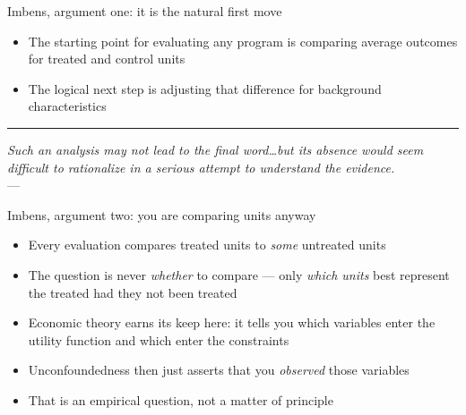 \documentclass{beamer}
\newcommand{\pullquote}[2]{%
  \begin{flushleft}
    {\color{accent}\rule{0.4em}{2.5em}}\hspace{0.6em}%
    \begin{minipage}[c]{0.85\textwidth}
      {\color{charcoal}\itshape\large #1}%
      \ifx\relax#2\relax\else\\[0.3em]{\color{warmgray}\small --- #2}\fi
    \end{minipage}
  \end{flushleft}
}
\begin{document}
\begin{frame}{Imbens, argument one: it is the natural first move}

\begin{itemize}
\item The starting point for evaluating any program is comparing average outcomes for treated and control units
\item The logical next step is adjusting that difference for background characteristics
\end{itemize}

\vspace{0.8em}

\pullquote{Such an analysis may not lead to the final word\dots but its absence would seem difficult to rationalize in a serious attempt to understand the evidence.}{}

\end{frame}


\begin{frame}{Imbens, argument two: you are comparing units anyway}

\begin{itemize}
\item Every evaluation compares treated units to \emph{some} untreated units
\item The question is never \emph{whether} to compare --- only \emph{which units} best represent the treated had they not been treated
\end{itemize}

\vspace{0.8em}

\begin{itemize}
\item Economic theory earns its keep here: it tells you which variables enter the utility function and which enter the constraints
\item Unconfoundedness then just asserts that you \emph{observed} those variables
\item That is an empirical question, not a matter of principle
\end{itemize}

\end{frame}
\end{document}
